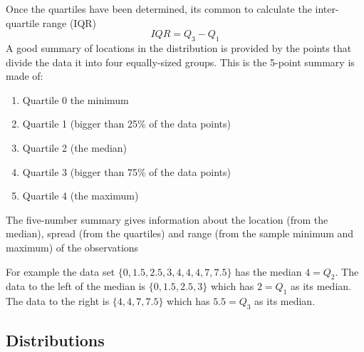 Once the quartiles have been determined, its common to calculate the inter-quartile range (IQR)
\begin{equation}
IQR = Q_3 - Q_1
\end{equation}
A good summary of locations in the distribution is provided by the points that divide the data it into four equally-sized groups. This is the 5-point summary is made of:
\begin{enumerate}
    \item Quartile 0 the minimum
    \item Quartile 1 (bigger than 25\% of the data points)
    \item Quartile 2 (the median)
    \item Quartile 3 (bigger than 75\% of the data points)
    \item Quartile 4 (the maximum)
\end{enumerate}
The five-number summary gives information about the location (from the median), spread (from the quartiles) and range (from the sample minimum and maximum) of the observations

For example the data set $\{0, 1.5, 2.5, 3, 4, 4, 4, 7, 7.5\}$ has the median $4 = Q_2$. The data to the left of the median is $\{0, 1.5, 2.5, 3\}$ which has $2 = Q_1$ as its median. The data to the right is $\{4, 4, 7, 7.5\}$ which has $5.5 = Q_3$ as its median.



\subsection{Distributions}

